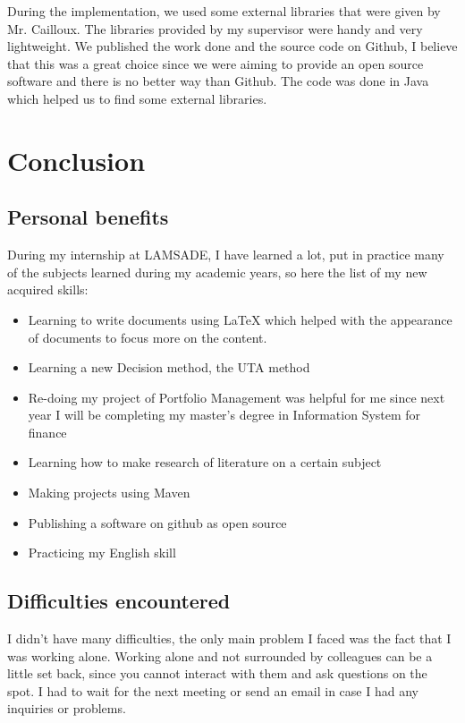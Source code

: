 \documentclass{report}
\begin{document}
During the implementation, we used some external libraries that were given by Mr. Cailloux. The libraries provided by my supervisor were handy and very lightweight. We published the work done and the source code on Github, I believe that this was a great choice since we were aiming to provide an open source software and there is no better way than Github. The code was done in Java which helped us to find some external libraries.\\


\chapter{Conclusion}

\section{Personal benefits}
During my internship at LAMSADE, I have learned a lot, put in practice many of the subjects learned during my academic years, so here the list of my new acquired skills: 
\begin{itemize}
\item Learning to write documents using LaTeX which helped with the appearance of documents to focus more on the content. 
\item Learning a new Decision method, the UTA method
\item Re-doing my project of Portfolio Management was helpful for me since next year I will be completing my master’s degree in Information System for finance
\item Learning how to make research of literature on a certain subject 
\item Making projects using Maven
\item Publishing a software on github as open source
\item Practicing my English skill\\
\end{itemize}

\section{Difficulties encountered}
I didn't have many difficulties, the only main problem I faced was the fact that I was working alone. Working alone and not surrounded by colleagues can be a little set back, since you cannot interact with them and ask questions on the spot. I had to wait for the next meeting or send an email in case I had any inquiries or problems.\\
\end{document}
